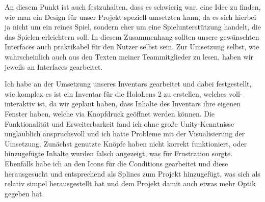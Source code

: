 \documentclass[11pt]{article}
\begin{document}
    An diesem Punkt ist auch festzuhalten, dass es schwierig war, eine Idee zu finden, wie man ein Design
    für unser Projekt speziell umsetzten kann, da es sich hierbei ja nicht um ein reines Spiel, sondern eher
    um eine Spielunterstützung handelt, die das Spielen erleichtern soll. In diesem Zusammenhang sollten
    unsere gewünschten Interfaces auch praktikabel für den Nutzer selbst sein.
    Zur Umsetzung selbst, wie wahrscheinlich auch aus den Texten meiner Teammitglieder zu lesen,
    haben wir jeweils an Interfaces gearbeitet.

    Ich habe an der Umsetzung unseres Inventars gearbeitet und dabei festgestellt,
    wie komplex es ist ein Inventar für die HoloLens 2 zu erstellen, welches voll-interaktiv ist,
    da wir geplant haben, dass Inhalte des Inventars ihre eigenen Fenster haben, welche via Knopfdruck
    geöffnet werden können.
    Die Funktionalität und Erweiterbarkeit fand ich ohne große Unity-Kenntnisse unglaublich anspruchsvoll und
    ich hatte Probleme mit der Visualisierung der Umsetzung.
    Zunächst genutzte Knöpfe haben nicht korrekt funktioniert, oder hinzugefügte Inhalte wurden falsch
    angezeigt, was für Frustration sorgte.
    Ebenfalls habe ich an den Icons für die Conditions gearbeitet und diese herausgesucht und entsprechend
    als Splines zum Projekt hinzugefügt, was sich als relativ simpel herausgestellt hat und dem Projekt damit
    auch etwas mehr Optik gegeben hat.
\end{document}
